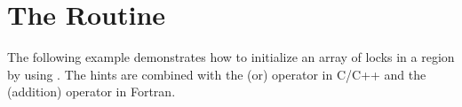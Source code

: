 \pagebreak
\chapter{The  Routine}
\label{chap:init_lock_with_hint}

The following example demonstrates how to initialize an array of locks in a  region by using .
The hints are combined with the \code{|} (or) operator in C/C++ and the \code{+} (addition) operator in Fortran.



